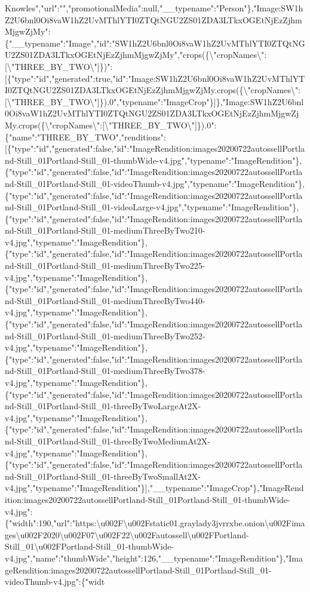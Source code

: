 Knowles","url":"","promotionalMedia":null,"\_\_typename":"Person"\},"Image:SW1hZ2U6bnl0Oi8vaW1hZ2UvMThlYTI0ZTQtNGU2ZS01ZDA3LTkxOGEtNjEzZjhmMjgwZjMy":\{"\_\_typename":"Image","id":"SW1hZ2U6bnl0Oi8vaW1hZ2UvMThlYTI0ZTQtNGU2ZS01ZDA3LTkxOGEtNjEzZjhmMjgwZjMy","crops(\{\textbackslash{}"cropNames\textbackslash{}":{[}\textbackslash{}"THREE\_BY\_TWO\textbackslash{}"{]}\})":{[}\{"type":"id","generated":true,"id":"Image:SW1hZ2U6bnl0Oi8vaW1hZ2UvMThlYTI0ZTQtNGU2ZS01ZDA3LTkxOGEtNjEzZjhmMjgwZjMy.crops(\{\textbackslash{}"cropNames\textbackslash{}":{[}\textbackslash{}"THREE\_BY\_TWO\textbackslash{}"{]}\}).0","typename":"ImageCrop"\}{]}\},"Image:SW1hZ2U6bnl0Oi8vaW1hZ2UvMThlYTI0ZTQtNGU2ZS01ZDA3LTkxOGEtNjEzZjhmMjgwZjMy.crops(\{\textbackslash{}"cropNames\textbackslash{}":{[}\textbackslash{}"THREE\_BY\_TWO\textbackslash{}"{]}\}).0":\{"name":"THREE\_BY\_TWO","renditions":{[}\{"type":"id","generated":false,"id":"ImageRendition:images20200722autossellPortland-Still\_01Portland-Still\_01-thumbWide-v4.jpg","typename":"ImageRendition"\},\{"type":"id","generated":false,"id":"ImageRendition:images20200722autossellPortland-Still\_01Portland-Still\_01-videoThumb-v4.jpg","typename":"ImageRendition"\},\{"type":"id","generated":false,"id":"ImageRendition:images20200722autossellPortland-Still\_01Portland-Still\_01-videoLarge-v4.jpg","typename":"ImageRendition"\},\{"type":"id","generated":false,"id":"ImageRendition:images20200722autossellPortland-Still\_01Portland-Still\_01-mediumThreeByTwo210-v4.jpg","typename":"ImageRendition"\},\{"type":"id","generated":false,"id":"ImageRendition:images20200722autossellPortland-Still\_01Portland-Still\_01-mediumThreeByTwo225-v4.jpg","typename":"ImageRendition"\},\{"type":"id","generated":false,"id":"ImageRendition:images20200722autossellPortland-Still\_01Portland-Still\_01-mediumThreeByTwo440-v4.jpg","typename":"ImageRendition"\},\{"type":"id","generated":false,"id":"ImageRendition:images20200722autossellPortland-Still\_01Portland-Still\_01-mediumThreeByTwo252-v4.jpg","typename":"ImageRendition"\},\{"type":"id","generated":false,"id":"ImageRendition:images20200722autossellPortland-Still\_01Portland-Still\_01-mediumThreeByTwo378-v4.jpg","typename":"ImageRendition"\},\{"type":"id","generated":false,"id":"ImageRendition:images20200722autossellPortland-Still\_01Portland-Still\_01-threeByTwoLargeAt2X-v4.jpg","typename":"ImageRendition"\},\{"type":"id","generated":false,"id":"ImageRendition:images20200722autossellPortland-Still\_01Portland-Still\_01-threeByTwoMediumAt2X-v4.jpg","typename":"ImageRendition"\},\{"type":"id","generated":false,"id":"ImageRendition:images20200722autossellPortland-Still\_01Portland-Still\_01-threeByTwoSmallAt2X-v4.jpg","typename":"ImageRendition"\}{]},"\_\_typename":"ImageCrop"\},"ImageRendition:images20200722autossellPortland-Still\_01Portland-Still\_01-thumbWide-v4.jpg":\{"width":190,"url":"https:\textbackslash{}u002F\textbackslash{}u002Fstatic01.graylady3jvrrxbe.onion\textbackslash{}u002Fimages\textbackslash{}u002F2020\textbackslash{}u002F07\textbackslash{}u002F22\textbackslash{}u002Fautossell\textbackslash{}u002FPortland-Still\_01\textbackslash{}u002FPortland-Still\_01-thumbWide-v4.jpg","name":"thumbWide","height":126,"\_\_typename":"ImageRendition"\},"ImageRendition:images20200722autossellPortland-Still\_01Portland-Still\_01-videoThumb-v4.jpg":\{"widt